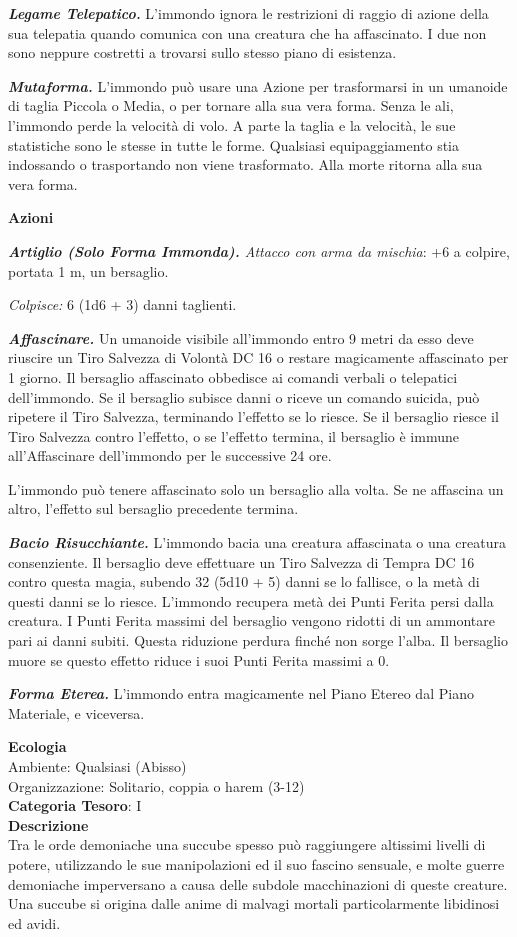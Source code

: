 \begin{multicols}{2}
{\medskip

\emph{\textbf{Legame Telepatico.}} L'immondo ignora le restrizioni di raggio di azione della sua telepatia quando comunica con una creatura che ha affascinato. I due non sono neppure costretti a trovarsi sullo stesso piano di esistenza.

\emph{\textbf{Mutaforma.}} L'immondo può usare una Azione per trasformarsi in un umanoide di taglia Piccola o Media, o per tornare alla sua vera forma. Senza le ali, l'immondo perde la velocità di volo. A parte la taglia e la velocità, le sue statistiche sono le stesse in tutte le forme. Qualsiasi equipaggiamento stia indossando o trasportando non viene trasformato. Alla morte ritorna alla sua vera forma.

\textbf{Azioni}

\emph{\textbf{Artiglio (Solo Forma Immonda).} Attacco con arma da mischia}: +6 a colpire, portata 1 m, un bersaglio.

\emph{Colpisce:} 6 (1d6 + 3) danni taglienti.

\emph{\textbf{Affascinare.}} Un umanoide visibile all'immondo entro 9 metri da esso deve riuscire un Tiro Salvezza di Volontà DC 16 o restare magicamente affascinato per 1 giorno. Il bersaglio affascinato obbedisce ai comandi verbali o telepatici dell'immondo. Se il bersaglio subisce danni o riceve un comando suicida, può ripetere il Tiro Salvezza, terminando l'effetto se lo riesce. Se il bersaglio riesce il Tiro Salvezza contro l'effetto, o se l'effetto termina, il bersaglio è immune all'Affascinare dell'immondo per le successive 24 ore.

L'immondo può tenere affascinato solo un bersaglio alla volta. Se ne affascina un altro, l'effetto sul bersaglio precedente termina.

\emph{\textbf{Bacio Risucchiante.}} L'immondo bacia una creatura affascinata o una creatura consenziente. Il bersaglio deve effettuare un Tiro Salvezza di Tempra DC 16 contro questa magia, subendo 32 (5d10 + 5) danni se lo fallisce, o la metà di questi danni se lo riesce. L'immondo recupera metà dei Punti Ferita persi dalla creatura. I Punti Ferita massimi del bersaglio vengono ridotti di un ammontare pari ai danni subiti. Questa riduzione perdura finché non sorge l'alba. Il bersaglio muore se questo effetto riduce i suoi Punti Ferita massimi a 0.

\emph{\textbf{Forma Eterea.}} L'immondo entra magicamente nel Piano Etereo dal Piano Materiale, e viceversa.

\textbf{Ecologia}\\
Ambiente: Qualsiasi (Abisso)\\
Organizzazione: Solitario, coppia o harem (3-12)\\
\textbf{Categoria Tesoro}: I\\
\textbf{Descrizione}\\
Tra le orde demoniache una succube spesso può raggiungere altissimi livelli di potere, utilizzando le sue manipolazioni ed il suo fascino sensuale, e molte guerre demoniache imperversano a causa delle subdole macchinazioni di queste creature. Una succube si origina dalle anime di malvagi mortali particolarmente libidinosi ed avidi.

}
\end{multicols}

